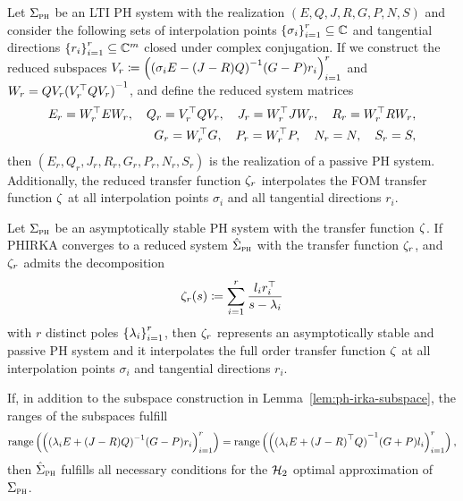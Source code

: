 \begin{lemma}\label{lem:ph-irka-subspace}
    Let $\Sigma_{\textnormal{\scshape ph}}$ be an \ac{LTI} \ac{PH} system with the realization $(E, Q, J, R, G, P, N, S)$ and consider the following sets of interpolation points ${\left\{\sigma_i\right\}}_{i = 1}^r \subseteq \mathbb{C}$ and tangential directions ${\left\{r_i\right\}}_{i = 1}^r \subseteq \mathbb{C}^m$ closed under complex conjugation.
    If we construct the reduced subspaces $V_r \coloneqq {\left( {(\sigma_i E - (J - R) Q)}\inv (G - P) r_i \right)}_{i = 1}^r$ and $W_r = Q V_r {(V_r\trans Q V_r)}\inv$, and define the reduced system matrices
    \begin{equation*}
        \begin{split}
            E_r = W_r^{\top} E W_r,\quad Q_r = V_r^{\top} Q V_r,\quad J_r = W_r^{\top} J W_r,\quad R_r = W_r^{\top} R W_r, \\
            G_r = W_r^{\top} G,\quad P_r = W_r^{\top} P,\quad N_r = N,\quad S_r = S,
        \end{split}
    \end{equation*}
    then $(E_r, Q_r, J_r, R_r, G_r, P_r, N_r, S_r)$ is the realization of a passive \ac{PH} system.
    Additionally, the reduced transfer function $\zeta_r$ interpolates the \ac{FOM} transfer function $\zeta$ at all interpolation points $\sigma_i$ and all tangential directions $r_i$.
\end{lemma}

\begin{theorem}\label{thm:ph-irka-subspace}
    Let $\Sigma_{\textnormal{\scshape ph}}$ be an asymptotically stable \ac{PH} system with the transfer function $\zeta$.
    If \ac{PHIRKA} converges to a reduced system $\hat{\Sigma}_{\textnormal{\scshape ph}}$ with the transfer function $\zeta_r$, and $\zeta_r$ admits the decomposition
    \begin{equation*}
        \zeta_r(s) \coloneqq \sum\limits_{i = 1}^r \frac{l_i r_i^{\top}}{s - \lambda_i}
    \end{equation*}
    with $r$ distinct poles ${\left\{\lambda_i\right\}}_{i = 1}^r$, then $\zeta_r$ represents an asymptotically stable and passive \ac{PH} system and it interpolates the full order transfer function $\zeta$ at all interpolation points $\sigma_i$ and tangential directions $r_i$.

    If, in addition to the subspace construction in Lemma~\ref{lem:ph-irka-subspace}, the ranges of the subspaces fulfill
    \begin{equation*}
        \range{{\left( {(\lambda_i E + (J - R) Q)}\inv (G - P) r_i \right)}_{i = 1}^r} = \range{{\left( {(\lambda_i E + {(J - R)}\trans Q)}\inv (G + P) l_i \right)}_{i = 1}^r},
    \end{equation*}
    then $\hat{\Sigma}_{\textnormal{\scshape ph}}$ fulfills all necessary conditions for the $\mathcal{H}_2$ optimal approximation of $\Sigma_{\textnormal{\scshape ph}}$.
\end{theorem}

